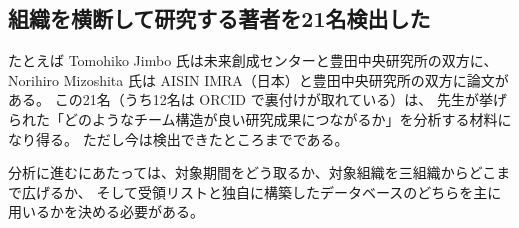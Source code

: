 \documentclass[a4paper,10pt]{ltjsarticle}
\begin{document}
\subsection{組織を横断して研究する著者を21名検出した}

たとえば Tomohiko Jimbo 氏は未来創成センターと豊田中央研究所の双方に、
Norihiro Mizoshita 氏は AISIN IMRA（日本）と豊田中央研究所の双方に論文がある。
この21名（うち12名は ORCID で裏付けが取れている）は、
先生が挙げられた「どのようなチーム構造が良い研究成果につながるか」を分析する材料になり得る。
ただし今は検出できたところまでである。

分析に進むにあたっては、対象期間をどう取るか、対象組織を三組織からどこまで広げるか、
そして受領リストと独自に構築したデータベースのどちらを主に用いるかを決める必要がある。
\end{document}
